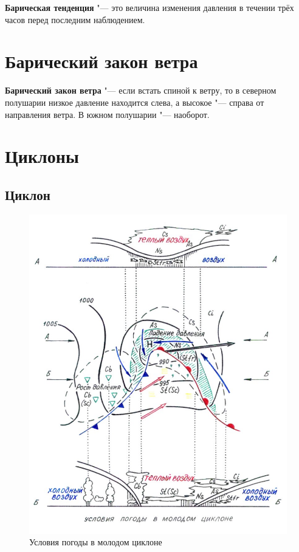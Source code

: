 \documentclass[a4paper, 12pt, twoside, draft, book, russian, fittopage, cyremdash, openright]{ncc}
\begin{document}
\textbf{Барическая тенденция} "--- это
величина изменения давления в течении трёх часов перед последним
наблюдением.

\section{Барический закон ветра}
\label{sec:baric_wind_law}

\textbf{Барический закон ветра} "---
если встать спиной к ветру, то в северном полушарии низкое давление
находится слева, а высокое "--- справа от направления ветра. В южном
полушарии "--- наоборот.

\section{Циклоны}

\subsection{Циклон}
\label{sec:cyclon}

\begin{figure}[htb]
   \centering
   \includegraphics[scale=1.0]{03_cyclon.pdf}
   \caption{Условия погоды в молодом циклоне}
   \label{fig:03_cyclon}
\end{figure}
\end{document}
